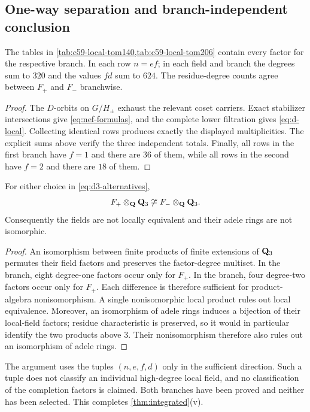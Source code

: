 \subsection{One-way separation and branch-independent conclusion}

\begin{proposition}
\label{prop:complete-local-tables}
The tables in \cref{tab:c59-local-tom140,tab:c59-local-tom206} contain every
factor for the respective branch.  In each row $n=ef$; in each field and
branch the degrees sum to $320$ and the values $fd$ sum to $624$.
The residue-degree counts agree between $F_+$ and $F_-$ branchwise.
\end{proposition}

\begin{proof}
The $D$-orbits on $G/H_\pm$ exhaust the relevant coset carriers.  Exact
stabilizer intersections give \eqref{eq:nef-formulas}, and the complete lower
filtration gives \eqref{eq:d-local}.  Collecting identical rows produces
exactly the displayed multiplicities.  The explicit sums above verify the
three independent totals.  Finally, all rows in the first branch have
$f=1$ and there are $36$ of them, while all rows in the second have $f=2$
and there are $18$ of them.
\end{proof}

\begin{corollary}
\label{cor:local-separation}
For either choice in \eqref{eq:d3-alternatives},
\[
 F_+\otimes_{\mathbf{Q}}\mathbf{Q}_{3}\not\cong F_-\otimes_{\mathbf{Q}}\mathbf{Q}_{3}.
\]
Consequently the fields are not locally equivalent and their adele rings are
not isomorphic.
\end{corollary}

\begin{proof}
An isomorphism between finite products of finite extensions of $\mathbf{Q}_{3}$
permutes their field factors and preserves the factor-degree multiset.  In
the  branch, eight degree-one factors occur only for $F_+$.  In the
 branch, four degree-two factors occur only for $F_+$.  Each
difference is therefore sufficient for product-algebra nonisomorphism.  A
single nonisomorphic local product rules out local equivalence.  Moreover, an
isomorphism of adele rings induces a bijection of their local-field factors;
residue characteristic is preserved, so it would in particular identify the
two products above $3$.  Their nonisomorphism therefore also rules out an
isomorphism of adele rings.
\end{proof}

The argument uses the tuples $(n,e,f,d)$ only in the sufficient direction.
Such a tuple does not classify an individual high-degree local field, and no
classification of the completion factors is claimed.  Both branches have
been proved and neither has been selected.  This completes
\cref{thm:integrated}(v).
